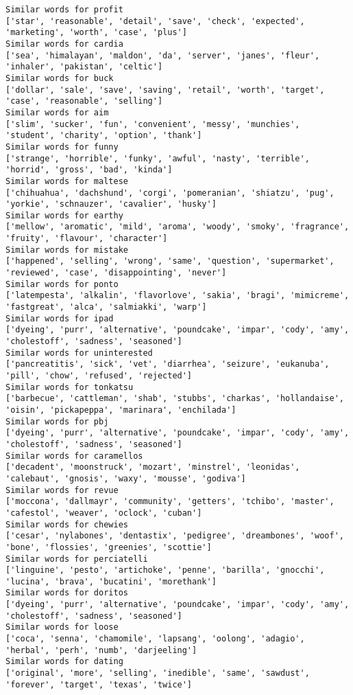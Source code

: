 \documentclass[11pt]{article}
\begin{document}
\begin{Verbatim}[commandchars=\\\{\}]
Similar words for profit
['star', 'reasonable', 'detail', 'save', 'check', 'expected', 'marketing', 'worth', 'case', 'plus']
Similar words for cardia
['sea', 'himalayan', 'maldon', 'da', 'server', 'janes', 'fleur', 'inhaler', 'pakistan', 'celtic']
Similar words for buck
['dollar', 'sale', 'save', 'saving', 'retail', 'worth', 'target', 'case', 'reasonable', 'selling']
Similar words for aim
['slim', 'sucker', 'fun', 'convenient', 'messy', 'munchies', 'student', 'charity', 'option', 'thank']
Similar words for funny
['strange', 'horrible', 'funky', 'awful', 'nasty', 'terrible', 'horrid', 'gross', 'bad', 'kinda']
Similar words for maltese
['chihuahua', 'dachshund', 'corgi', 'pomeranian', 'shiatzu', 'pug', 'yorkie', 'schnauzer', 'cavalier', 'husky']
Similar words for earthy
['mellow', 'aromatic', 'mild', 'aroma', 'woody', 'smoky', 'fragrance', 'fruity', 'flavour', 'character']
Similar words for mistake
['happened', 'selling', 'wrong', 'same', 'question', 'supermarket', 'reviewed', 'case', 'disappointing', 'never']
Similar words for ponto
['latempesta', 'alkalin', 'flavorlove', 'sakia', 'bragi', 'mimicreme', 'fastgreat', 'alca', 'salmiakki', 'warp']
Similar words for ipad
['dyeing', 'purr', 'alternative', 'poundcake', 'impar', 'cody', 'amy', 'cholestoff', 'sadness', 'seasoned']
Similar words for uninterested
['pancreatitis', 'sick', 'vet', 'diarrhea', 'seizure', 'eukanuba', 'pill', 'chow', 'refused', 'rejected']
Similar words for tonkatsu
['barbecue', 'cattleman', 'shab', 'stubbs', 'charkas', 'hollandaise', 'oisin', 'pickapeppa', 'marinara', 'enchilada']
Similar words for pbj
['dyeing', 'purr', 'alternative', 'poundcake', 'impar', 'cody', 'amy', 'cholestoff', 'sadness', 'seasoned']
Similar words for caramellos
['decadent', 'moonstruck', 'mozart', 'minstrel', 'leonidas', 'calebaut', 'gnosis', 'waxy', 'mousse', 'godiva']
Similar words for revue
['moccona', 'dallmayr', 'community', 'getters', 'tchibo', 'master', 'cafestol', 'weaver', 'oclock', 'cuban']
Similar words for chewies
['cesar', 'nylabones', 'dentastix', 'pedigree', 'dreambones', 'woof', 'bone', 'flossies', 'greenies', 'scottie']
Similar words for perciatelli
['linguine', 'pesto', 'artichoke', 'penne', 'barilla', 'gnocchi', 'lucina', 'brava', 'bucatini', 'morethank']
Similar words for doritos
['dyeing', 'purr', 'alternative', 'poundcake', 'impar', 'cody', 'amy', 'cholestoff', 'sadness', 'seasoned']
Similar words for loose
['coca', 'senna', 'chamomile', 'lapsang', 'oolong', 'adagio', 'herbal', 'perh', 'numb', 'darjeeling']
Similar words for dating
['original', 'more', 'selling', 'inedible', 'same', 'sawdust', 'forever', 'target', 'texas', 'twice']

\end{Verbatim}
\end{document}

